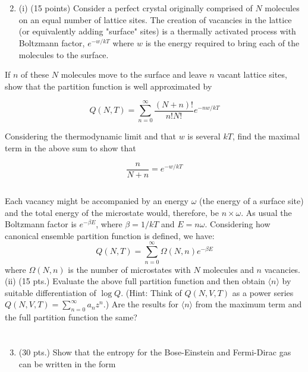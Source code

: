 \documentclass[10pt]{article}
\begin{document}
\section{}
\begin{enumerate}
  \setcounter{enumi}{1}
  \item (i) (15 points) Consider a perfect crystal originally comprised of $N$ molecules on an equal number of lattice sites. The creation of vacancies in the lattice (or equivalently adding "surface" sites) is a thermally activated process with Boltzmann factor, $e^{-w / k T}$ where $w$ is the energy required to bring each of the molecules to the surface.
\end{enumerate}

If $n$ of these $N$ molecules move to the surface and leave $n$ vacant lattice sites, show that the partition function is well approximated by

$$
Q(N, T)=\sum_{n=0}^{\infty} \frac{(N+n) !}{n ! N !} e^{-n w / k T}
$$

Considering the thermodynamic limit and that $w$ is several $k T$, find the maximal term in the above sum to show that

$$
\frac{n}{N+n}=e^{-w / k T}
$$
\subsection{}
Each vacancy might be accompanied by an energy $\omega$ (the energy of a surface site) and the total energy of the microstate would, therefore, be $n\times \omega$.
As usual the Boltzmann factor is $e^{-\beta E}$, where $\beta=1/kT$ and $E=n\omega$.
Considering how canonical ensemble partition function is defined, we have:
\begin{equation}
  Q(N,T)=\sum_{n=0}^{\infty}\Omega (N,n)e^{-\beta E}
\end{equation}
where $\Omega (N,n)$ is the number of microstates with $N$ molecules and $n$ vacancies.
(ii) (15 pts.) Evaluate the above full partition function and then obtain $\langle n\rangle$ by suitable differentiation of $\log Q$. (Hint: Think of $Q(N, V, T)$ as a power series $Q(N, V, T)=\sum_{n=0}^{\infty} a_{n} z^{n}$.) Are the results for $\langle n\rangle$ from the maximum term and the full partition function the same?
\section{}
\begin{enumerate}
  \setcounter{enumi}{2}
  \item (30 pts.) Show that the entropy for the Bose-Einstein and Fermi-Dirac gas can be written in the form
\end{enumerate}
\end{document}
